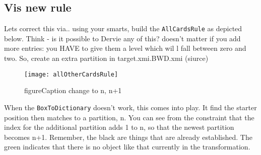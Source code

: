\newpage
\hypertarget{allCards vis}{}
\subsection{Vis new rule}
\visHeader

Lets correct this via.. using your smarts, build the \texttt{AllCardsRule} as depicted below. Think - is it possible to Dervie any of this?
doesn't matter if you add more entries: you HAVE to give them a level which wil l fall between zero and two.
So, create an extra partition in target.xmi.BWD.xmi (siurce)

\begin{figure}[htp]
\begin{center}
  \texttt{[image: allOtherCardsRule]}
  \caption{figureCaption \update change to n, n+1}
  \label{fig:allOtherCardsRule}
\end{center}
\end{figure}

When the \texttt{BoxToDictionary} doesn't work, this comes into play. It find the starter position then matches to a partition, n. You can see from the
constraint that the index for the additional partition adds 1 to n, so that the newest partition becomes n+1. Remember, the black are things that are already
established. The green indicates that there is no object like that currently in the transformation.
